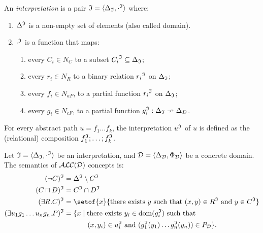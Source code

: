\begin{definition}[Interpretation]\label{def:interpretation}
    An \emph{interpretation} is a pair
    ${\mathfrak{I} = 
    \langle{\Delta_{\mathfrak{I}}, {\cdot^{\mathfrak{I}}}}\rangle} $ 
    where:
    \begin{enumerate}
      \item 
        $\Delta^{\mathfrak{I}}$ is a non-empty set of elements (also called domain).
      \item 
        $\cdot^{\mathfrak{I}}$ is a function that maps:
        \begin{enumerate}
          \item 
            every $C_i \in N_C$ to a subset ${C_i}^{\mathfrak{I}} \subseteq \Delta_{\mathfrak{I}}$;
          \item  
            every $r_i \in N_R$ to a binary relation ${r_i}^{\mathfrak{I}}$ on $\Delta_{\mathfrak{I}}$;
          \item 
            every  $f_i \in N_{aF}$, to a partial function ${r_i}^{\mathfrak{I}}$ on $\Delta_{\mathfrak{I}}$;
          \item 
            every $g_i \in N_{cF}$, to a partial function $g_i^{\mathfrak{I}} : \Delta_{\mathfrak{I}} \nrightarrow \Delta_D$.
        \end{enumerate}
    \end{enumerate}
    For every abstract path $u = f_1 \dots f_k$, the interpretation $u^{\mathfrak{I}}$ of $u$ is defined as the (relational) composition $f_1^{\mathfrak{I}}; \dots; f_k^{\mathfrak{I}}$.
  \end{definition}
  
  \begin{definition} [Semantics] \label{def:alcd:semantics} 
    Let ${\mathfrak{I} = \langle{\Delta_{\mathfrak{I}}, {\cdot^{\mathfrak{I}}}}\rangle}$ be an interpretation, and $\mathcal{D} = \langle{\Delta_{\mathcal{D}}, \Phi_{\mathcal{D}}}\rangle$ be a concrete domain.
    The semantics of $\mathcal{ALC(D)}$ concepts is: 
    \begin{align*}
      (\lnot C)^\interp                  ={}& \Delta^\interp \setminus C^\interp \\
      (C \sqcap D )^\interp              ={}&  {C^\interp} \cap {D^\interp} \\
      (\exists R.C )^\interp             ={}& \setof{x}{ \text{there exists } y \text{ such that } (x, y) \in R^\interp \text{ and } y \in C^\interp } \\
      (\exists u_1g_1 \dots u_ng_n.P)^\interp  ={}&  \{x \mid \text{there exists } {y_i \in \dom(g_i^\interp)} \text{ such that } \\
      & \qquad (x,y_i) \in u_i^\interp \text{ and } (g_1^\interp(y_1) \dots g_n^\interp(y_n)) \in P_\cdom \}.
  \end{align*}
  \end{definition}


